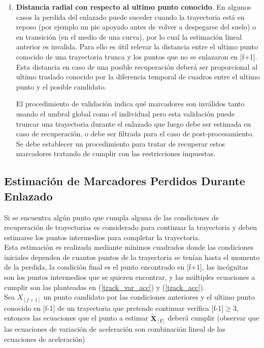 \begin{itemize}
\begin{enumerate}
  \item \textbf{Distancia radial con respecto al ultimo punto conocido}. En algunos casos la perdida del enlazado puede suceder cuando la trayectoria está en reposo (por ejemplo un pie apoyado antes de volver a despegarse del suelo) o en transición (en el medio de una curva), por lo cual la estimación lineal anterior es invalida. Para ello es útil relevar la distancia entre el ultimo punto conocido de una trayectoria trunca y los puntos que no se enlazaron en [f+1]. Esta distancia en caso de una posible recuperación deberá ser proporcional al ultimo traslado conocido por la diferencia temporal de cuadros entre el ultimo punto y el posible candidato.
 
El procedimiento de validación indica qué marcadores son inválidos tanto usando el umbral global como el individual pero esta validación puede truncar una trayectoria durante el enlazado que luego debe ser estimada en caso de recuperación, o debe ser filtrada para el caso de post-procesamiento. Se debe establecer un procedimiento para tratar de recuperar estos marcadores tratando de cumplir con las restricciones impuestas.
 
  
\end{enumerate} 

\end{itemize}

\subsection{Estimación de Marcadores Perdidos Durante Enlazado}

Si se encuentra algún punto que cumpla alguna de las condiciones de recuperación de trayectorias es considerado para continuar la trayectoria y deben estimarse los puntos intermedios para completar la trayectoria.
\\ 

Esta estimación es realizada mediante mínimos cuadrados donde las condiciones iniciales dependen de cuantos puntos de la trayectoria se tenían hasta el momento de la perdida, la condición final es el punto encontrado en [f+1], las incógnitas son los puntos intermedios que se quieren encontrar, y las múltiples ecuaciones a cumplir son las planteadas en (\ref{track_var_acc}) y (\ref{track_acc}).
\\ 

Sea $X_{[f+1]}$ un punto candidato por las condiciones anteriores y el ultimo punto conocido en [f-1] de un trayectoria que pretende continuar verifica [f-1]$\geq$3, entonces las ecuaciones que el punto a estimar $\boldsymbol{\tilde{X}_{[f]}}$ deberá cumplir (observar que las ecuaciones de variación de aceleración son combinación lineal de las ecuaciones de aceleración)

